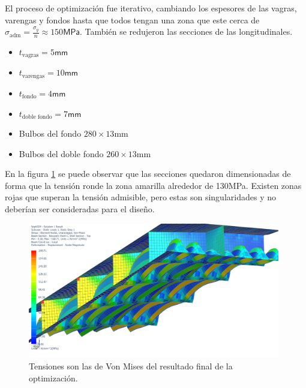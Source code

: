 \documentclass[onecolumn,10pt,titlepage]{article}
\newcommand{\adm}{\textrm{adm}}
\newcommand{\unit}[1]{\textsf{#1}}
\newcommand{\mega}{\unit{M}}
\newcommand{\milli}{\unit{m}}
\newcommand{\meter}{\unit{m}}
\newcommand{\pascal}{\unit{Pa}}
\newcommand{\si}[1]{#1}
\newcommand{\SI}[2]{#1\si{#2}}
\begin{document}
El proceso de optimización fue iterativo, cambiando los espesores de las vagras, varengas y fondos hasta que todos tengan una zona que este cerca de $\sigma_{\adm}=\frac{\sigma_{y}}{n}\approx\SI{150}{\mega \pascal}$. También se redujeron las secciones de las longitudinales.
\begin{itemize}
	\item $t_{\textrm{vagras}}=\SI{5}{\milli \meter}$
	\item $t_{\textrm{varengas}}=\SI{10}{\milli \meter}$
	\item $t_{\textrm{fondo}}=\SI{4}{\milli \meter}$
	\item $t_{\textrm{doble fondo}}=\SI{7}{\milli \meter}$
	\item Bulbos del fondo $280\times 13$\si{\milli \meter}
	\item Bulbos del doble fondo $260\times 13$\si{\milli \meter}
\end{itemize}

En la figura \ref{fig:optimizacion} se puede observar que las secciones quedaron dimensionadas de forma que la tensión ronde la zona amarilla alrededor de \SI{130}{\mega\pascal}. Existen zonas rojas que superan la tensión admisible, pero estas son singularidades y no deberían ser consideradas para el diseño.

 \begin{figure}
     \centering
     \includegraphics[width=11cm]{fig/VoptiSIM.png}
     \caption{Tensiones son las de Von Mises del resultado final de la optimización.}
     \label{fig:optimizacion}
 \end{figure}
\end{document}
